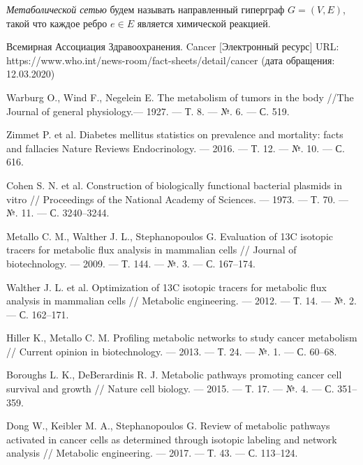 \documentclass[14pt, a4paper]{extreport}
\begin{document}
\begin{appendices}
	\emph{Метаболической сетью} будем называть направленный гиперграф $G = (V, E)$, такой что каждое ребро $e \in E$ является химической реакцией.
\end{appendices}

\cleardoublepage
{}
{}
\begin{thebibliography}{XXXX}
	Всемирная Ассоциация Здравоохранения. Cancer [Электронный ресурс] URL: https://www.who.int/news-room/fact-sheets/detail/cancer (дата обращения: 12.03.2020)
	
	Warburg O., Wind F., Negelein E. The metabolism of tumors in the body //The Journal of general physiology.--- 1927. --- Т. 8. --- №. 6. --- С. 519.
	
	Zimmet P. et al. Diabetes mellitus statistics on prevalence and mortality: facts and fallacies Nature Reviews Endocrinology. --- 2016. --- Т. 12. --- №. 10. --- С. 616.
	
	Cohen S. N. et al. Construction of biologically functional bacterial plasmids in vitro // Proceedings of the National Academy of Sciences. --- 1973. --- Т. 70. --- №. 11. --- С. 3240--3244.
	
	Metallo C. M., Walther J. L., Stephanopoulos G. Evaluation of 13C isotopic tracers for metabolic flux analysis in mammalian cells // Journal of biotechnology. --- 2009. --- Т. 144. --- №. 3. --- С. 167--174.
	
	Walther J. L. et al. Optimization of 13C isotopic tracers for metabolic flux analysis in mammalian cells // Metabolic engineering. --- 2012. --- Т. 14. --- №. 2. --- С. 162--171.
	
	Hiller K., Metallo C. M. Profiling metabolic networks to study cancer metabolism // Current opinion in biotechnology. --- 2013. --- Т. 24. --- №. 1. --- С. 60--68.
	
	Boroughs L. K., DeBerardinis R. J. Metabolic pathways promoting cancer cell survival and growth // Nature cell biology. --- 2015. --- Т. 17. --- №. 4. --- С. 351--359.
	
	Dong W., Keibler M. A., Stephanopoulos G. Review of metabolic pathways activated in cancer cells as determined through isotopic labeling and network analysis // Metabolic engineering. --- 2017. --- Т. 43. --- С. 113--124.
	

\end{thebibliography}
\end{document}
